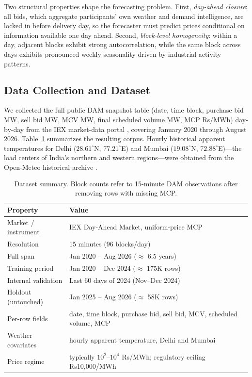 \documentclass[preprint,12pt]{elsarticle}
\newcommand{\Rs}{Rs}
\begin{document}
\begin{enumerate}
Two structural properties shape the forecasting problem. First, \emph{day-ahead closure}: all bids, which aggregate participants' own weather and demand intelligence, are locked in before delivery day, so the forecaster must predict prices conditional on information available one day ahead. Second, \emph{block-level homogeneity}: within a day, adjacent blocks exhibit strong autocorrelation, while the same block across days exhibits pronounced weekly seasonality driven by industrial activity patterns.

\subsection{Data Collection and Dataset}\label{sec:dataset}

We collected the full public DAM snapshot table (date, time block, purchase bid MW, sell bid MW, MCV MW, final scheduled volume MW, MCP \Rs/MWh) day-by-day from the IEX market-data portal \cite{iexdata}, covering January 2020 through August 2026. Table~\ref{tab:dataset} summarizes the resulting corpus. Hourly historical apparent temperatures for Delhi ($28.61^\circ$N, $77.21^\circ$E) and Mumbai ($19.08^\circ$N, $72.88^\circ$E)---the load centers of India's northern and western regions---were obtained from the Open-Meteo historical archive \cite{openmeteo}.

\begin{table}[t]
\centering
\caption{Dataset summary. Block counts refer to 15-minute DAM observations after removing rows with missing MCP.}
\label{tab:dataset}
\begin{tabular}{lll}
\toprule
\textbf{Property} & \textbf{Value} \\
\midrule
Market / instrument & IEX Day-Ahead Market, uniform-price MCP \\
Resolution & 15 minutes (96 blocks/day) \\
Full span & Jan 2020 -- Aug 2026 ($\approx$ 6.5 years) \\
Training period & Jan 2020 -- Dec 2024 ($\approx$ 175K rows) \\
Internal validation & Last 60 days of 2024 (Nov--Dec 2024) \\
Holdout (untouched) & Jan 2025 -- Aug 2026 ($\approx$ 58K rows) \\
Per-row fields & date, time block, purchase bid, sell bid, MCV, scheduled volume, MCP \\
Weather covariates & hourly apparent temperature, Delhi and Mumbai \\
Price regime & typically $10^2$--$10^4$ \Rs/MWh; regulatory ceiling \Rs10{,}000/MWh \\
\bottomrule
\end{tabular}
\end{table}


\end{enumerate}
\end{document}
